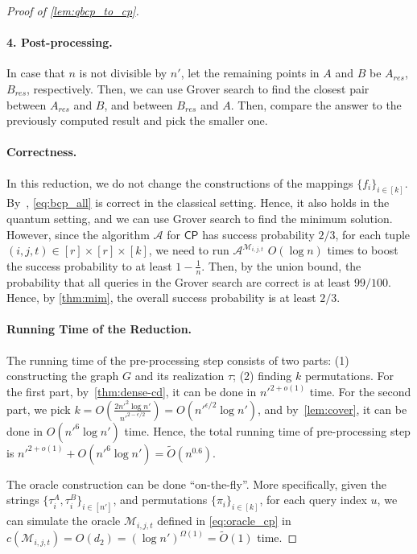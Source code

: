 \documentclass[10pt,a4paper]{article}
\newcommand{\wt}{\widetilde}
\newcommand{\CP}{\ensuremath{\mathsf{CP}}}
\begin{document}
\begin{proof}[Proof of \cref{lem:qbcp_to_cp}]
\paragraph*{4. Post-processing.} In case that $n$ is not divisible by $n'$, let the remaining points in $A$ and $B$ be $A_{res}$, $B_{res}$, respectively. Then, we can use Grover search to find the closest pair between $A_{res}$ and $B$, and between $B_{res}$ and $A$. Then, compare the answer to the previously computed result and pick the smaller one.

\paragraph*{Correctness.} In this reduction, we do not change the constructions of the mappings $\{f_i\}_{i\in [k]}$. By~\cite{r29}, \cref{eq:bcp_all} is correct in the classical setting. Hence, it also holds in the quantum setting, and we can use Grover search to find the minimum solution. However, since the algorithm $\mathcal{A}$ for $\CP$  has success probability $2/3$, for each tuple $(i,j,t)\in [r]\times [r]\times [k]$, we need to run $\mathcal{A}^{\mathcal{M}_{i,j,t}}$ $O(\log n)$ times to boost the success probability to at least $1-\frac{1}{n}$. Then, by the union bound, the probability that all queries in the Grover search are correct is at least $99/100$. Hence, by \cref{thm:mim}, the overall success probability is at least $2/3$.  


\paragraph*{Running Time of the Reduction.} 

The running time of the pre-processing step consists of two parts: (1) constructing the graph $G$ and its realization $\tau$; (2) finding $k$ permutations. For the first part, by~\cref{thm:dense-cd}, it can be done in $n'^{2+o(1)}$ time. For the second part, we pick $k=O(\frac{2n'^2\log n'}{n'^{2-\epsilon/2}})=O(n'^{\epsilon/2}\log n')$, and by~\cref{lem:cover}, it can be done in $O(n'^6 \log n')$ time. Hence, the total running time of pre-processing step is $n'^{2+o(1)}+O(n'^6\log n')=\wt{O}(n^{0.6})$.

The oracle construction can be done ``on-the-fly''. More specifically, given the strings $\{\tau^A_i,\tau^B_i\}_{i\in [n']}$, and permutations $\{\pi_i\}_{i\in [k]}$, for each query index $u$, we can simulate the oracle $\mathcal{M}_{i,j,t}$ defined in \cref{eq:oracle_cp} in $c(\mathcal{M}_{i,j,t})=O(d_2)=(\log n')^{\Omega(1)}=\wt{O}(1)$ time.


\end{proof}
\end{document}
